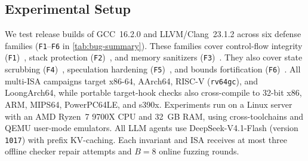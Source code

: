 \documentclass[conference,compsoc]{IEEEtran}
\begin{document}
\subsection{Experimental Setup}\label{sec:eval-setup}

We test release builds of GCC~16.2.0 and LLVM/Clang~23.1.2 across six defense families (\texttt{F1}--\texttt{F6} in \autoref{tab:bug-summary}). These families cover control-flow integrity (\texttt{F1})~\cite{abadi2009cfi,tice2014forwardcfi,burow2019shadowstacks}, stack protection (\texttt{F2})~\cite{cowan1998stackguard,kuznetsov2014cpi}, and memory sanitizers (\texttt{F3})~\cite{serebryany2012asan,serebryany2018memorytagging}. They also cover state scrubbing (\texttt{F4})~\cite{yang2017deadstore,simon2018whatyouc}, speculation hardening (\texttt{F5})~\cite{guarnieri2020spectector,vassena2021blade}, and bounds fortification (\texttt{F6})~\cite{gcc15instrumentation,glibcfortify}. All multi-ISA campaigns target x86-64, AArch64, RISC-V (\texttt{rv64gc}), and LoongArch64, while portable target-hook checks also cross-compile to 32-bit x86, ARM, MIPS64, PowerPC64LE, and s390x. Experiments run on a Linux server with an AMD Ryzen~7 9700X CPU and 32~GB RAM, using cross-toolchains and QEMU user-mode emulators. All LLM agents use DeepSeek-V4.1-Flash (version \texttt{1017}) with prefix KV-caching. Each invariant and ISA receives at most three offline checker repair attempts and $B = 8$ online fuzzing rounds.
\end{document}

